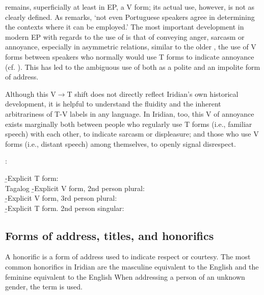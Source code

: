 {{				 remains, superficially at least in EP, a V form; its actual use, however, is not as clearly defined. As \textcite{laraport} remarks, `not even Portuguese speakers agree in determining the contexts where it can be employed.' The most important development in modern EP with regards to the use of  is that of conveying anger, sarcasm or annoyance, especially in asymmetric relations, similar to the older , the use of V forms between speakers who normally would use T forms to indicate annoyance (cf. \cite{hummelport}). This has led to the ambiguous use of  both as a polite and an impolite form of address.

				Although this V$\rightarrow$T shift does not directly reflect Iridian's own historical development, it is helpful to understand the fluidity and the inherent arbitrariness of T-V labels in any language. In Iridian, too, this V of annoyance exists marginally both between people who regularly use T forms (i.e., familiar speech) with each other, to indicate sarcasm or displeasure; and those who use V forms (i.e., distant speech) among themselves, to openly signal disrespect.
			}:\\
				 }
			\b{-}{Explicit T form:\\
				 }
		\endsubsub
	\a Tagalog
		\beginsubsub
			\b{-}{Explicit V form, 2nd person plural:\\
				 }
			\b{-}{Explicit V form, 3rd person plural:\\
				 }
			\b{-}{Explicit T form. 2nd person singular:\\
				 }
		\endsubsub
\xe

\subsection{Forms of address, titles, and honorifics}

A {\sc honorific} is a form of address used to indicate respect or courtesy. The most common honorifics in
Iridian are the masculine  equivalent to the English  and the feminine
 equivalent to the English  When addressing a person of an unknown
gender, the term  is used.

